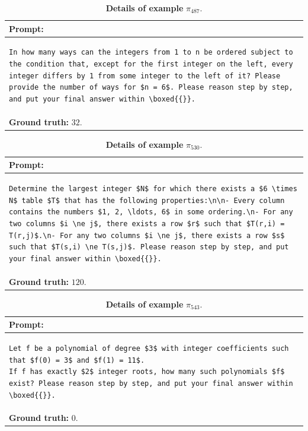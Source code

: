 \begin{table}[htbp]
\centering
\caption{\textbf{Details of example} $\pi_{487}$.}
\begin{tabular}{p{}}
\toprule
\textbf{Prompt:} \\
\midrule
\footnotesize
\begin{lstlisting}[breaklines=true, basicstyle=\ttfamily, aboveskip=-1.0em, belowskip=0pt, breakindent=0pt]
In how many ways can the integers from 1 to n be ordered subject to the condition that, except for the first integer on the left, every integer differs by 1 from some integer to the left of it? Please provide the number of ways for $n = 6$. Please reason step by step, and put your final answer within \boxed{{}}.
\end{lstlisting} \\
\midrule
\textbf{Ground truth:} $32$. \\
\bottomrule
\end{tabular}
\end{table}


\begin{table}[htbp]
\centering
\caption{\textbf{Details of example} $\pi_{530}$.}
\begin{tabular}{p{}}
\toprule
\textbf{Prompt:} \\
\midrule
\footnotesize
\begin{lstlisting}[breaklines=true, basicstyle=\ttfamily, aboveskip=-1.0em, belowskip=0pt, breakindent=0pt]
Determine the largest integer $N$ for which there exists a $6 \times N$ table $T$ that has the following properties:\n\n- Every column contains the numbers $1, 2, \ldots, 6$ in some ordering.\n- For any two columns $i \ne j$, there exists a row $r$ such that $T(r,i) = T(r,j)$.\n- For any two columns $i \ne j$, there exists a row $s$ such that $T(s,i) \ne T(s,j)$. Please reason step by step, and put your final answer within \boxed{{}}.
\end{lstlisting} \\
\midrule
\textbf{Ground truth:} $120$. \\
\bottomrule
\end{tabular}
\end{table}


\begin{table}[htbp]
\centering
\caption{\textbf{Details of example} $\pi_{543}$.}
\begin{tabular}{p{}}
\toprule
\textbf{Prompt:} \\
\midrule
\footnotesize
\begin{lstlisting}[breaklines=true, basicstyle=\ttfamily, aboveskip=-1.0em, belowskip=0pt, breakindent=0pt]
Let f be a polynomial of degree $3$ with integer coefficients such that $f(0) = 3$ and $f(1) = 11$.
If f has exactly $2$ integer roots, how many such polynomials $f$ exist? Please reason step by step, and put your final answer within \boxed{{}}.
\end{lstlisting} \\
\midrule
\textbf{Ground truth:} $0$. \\
\bottomrule
\end{tabular}
\end{table}


